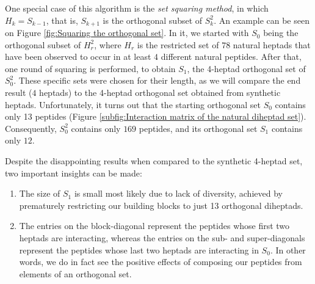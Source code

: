 \documentclass[12pt,a4paper,titlepage,openany]{report}
\begin{document}
One special case of this algorithm is the \emph{set squaring method}, in which $H_k = S_{k-1}$, that is, $S_{k+1}$ is the orthogonal subset of $S_k^2$. An example can be seen on Figure \ref{fig:Squaring the orthogonal set}. In it, we started with $S_0$ being the orthogonal subset of $H_r^2$, where $H_r$ is the  restricted set of $78$ natural heptads that have been observed to occur in at least $4$ different natural peptides. After that, one round of squaring is performed, to obtain $S_1$, the 4-heptad orthogonal set of $S_0^2$.
These specific sets were chosen for their length, as we will compare the end result ($4$ heptads) to the 4-heptad orthogonal set obtained from synthetic heptads. 
Unfortunately, it turns out that the starting orthogonal set $S_0$ contains only 13 peptides (Figure \ref{subfig:Interaction matrix of the natural diheptad set}). Consequently, $S_0^2$ contains only $169$ peptides, and its orthogonal set $S_1$ contains only $12$. %

Despite the disappointing results when compared to the synthetic 4-heptad set, two important insights can be made:
\begin{enumerate}
	\item The size of $S_1$ is small most likely due to lack of diversity, achieved by prematurely restricting our building blocks to just 13 orthogonal diheptads.
	\item The entries on the block-diagonal represent the peptides whose first two heptads are interacting, whereas the entries on the sub- and super-diagonals represent the peptides whose last two heptads are interacting in $S_0$. In other words, we do in fact see the positive effects of composing our peptides from elements of an orthogonal set.
\end{enumerate}
\end{document}
